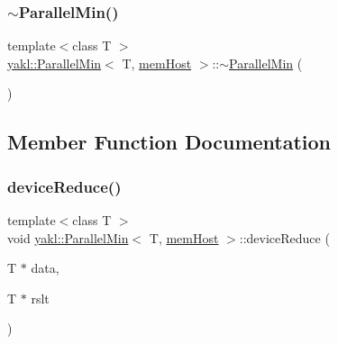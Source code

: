 \mbox{\label{classyakl_1_1ParallelMin_3_01T_00_01memHost_01_4_a9d54821f75ffbb9c02254e0fdb56dd6b}} 
\subsubsection{\texorpdfstring{$\sim$\+Parallel\+Min()}{~ParallelMin()}}
{\footnotesize\ttfamily template$<$class T $>$ \\
\hyperlink{classyakl_1_1ParallelMin}{yakl\+::\+Parallel\+Min}$<$ T, \hyperlink{namespaceyakl_aae8a8c910fec7cef7db68c9658c16405}{mem\+Host} $>$\+::$\sim$\hyperlink{classyakl_1_1ParallelMin}{Parallel\+Min} (\begin{DoxyParamCaption}{ }\end{DoxyParamCaption})\hspace{0.3cm}{\ttfamily [inline]}}



\subsection{Member Function Documentation}
\mbox{\label{classyakl_1_1ParallelMin_3_01T_00_01memHost_01_4_a343aaaacc5d4d030eb83c4483876cbcf}} 
\subsubsection{\texorpdfstring{device\+Reduce()}{deviceReduce()}}
{\footnotesize\ttfamily template$<$class T $>$ \\
void \hyperlink{classyakl_1_1ParallelMin}{yakl\+::\+Parallel\+Min}$<$ T, \hyperlink{namespaceyakl_aae8a8c910fec7cef7db68c9658c16405}{mem\+Host} $>$\+::device\+Reduce (\begin{DoxyParamCaption}\item[{T $\ast$}]{data,  }\item[{T $\ast$}]{rslt }\end{DoxyParamCaption})\hspace{0.3cm}{\ttfamily [inline]}}

